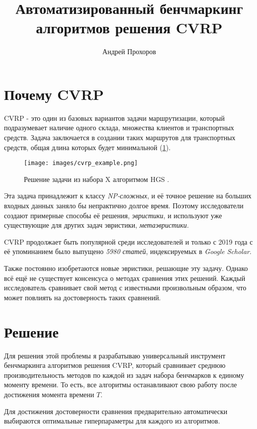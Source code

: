 \documentclass[a4paper,12pt]{article}
\title{Автоматизированный бенчмаркинг алгоритмов решения CVRP}
\author{Андрей Прохоров}
\date{\vspace{-5ex}}
\begin{document}
\maketitle

\section*{Почему CVRP}

CVRP - это один из базовых вариантов задачи маршрутизации, который подразумевает наличие одного склада, множества клиентов и транспортных средств.
Задача заключается в создании таких маршрутов для транспортных средств, общая длина которых будет минимальной (\cref{img_cvrp_example}).

\begin{figure}[h]
    \centering
    \texttt{[image: images/cvrp\_example.png]}
    \caption{
        Решение задачи из набора X
        \autocite{uchoaNewBenchmarkInstances2017}
        алгоритмом HGS
        \autocite{vidalHybridGeneticSearch2022}.
    }
    \label{img_cvrp_example} 
\end{figure}

Эта задача принадлежит к классу \emph{NP-сложных}, и её точное решение на больших входных данных заняло бы  непрактично долгое время.
Поэтому исследователи создают примерные способы её решения, \emph{эвристики}, и используют уже существующие для других задач эвристики, \emph{метаэвристики}.

CVRP продолжает быть популярной среди исследователей и только с 2019 года с её упоминанием было выпущено \emph{5980 статей}, индексируемых в \emph{Google Scholar}.

Также постоянно изобретаются новые эвристики, решающие эту задачу.
Однако всё ещё не существует консенсуса о методах сравнения этих решений. Каждый исследователь сравнивает свой метод с известными произвольным образом, что может повлиять на достоверность таких сравнений.

\section*{Решение}
Для решения этой проблемы я разрабатываю универсальный инструмент бенчмаркинга алгоритмов решения CVRP, который сравнивает среднюю производительность методов по каждой из задач набора бенчмарков к единому моменту времени.
То есть, все алгоритмы останавливают свою работу после достижения момента времени $T$.

Для достижения достоверности сравнения предварительно автоматически выбираются оптимальные гиперпараметры для каждого из алгоритмов.
\end{document}

